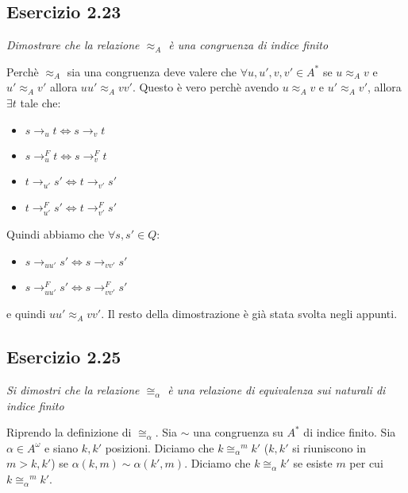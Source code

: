 \documentclass[12pt]{article}
\newcommand{\congAlpha}{\ensuremath{\cong_\alpha}\xspace}
\newcommand{\congAlphaM}{\ensuremath{\congAlpha^m}\xspace}
\begin{document}
\subsection*{Esercizio 2.23}
\textit{Dimostrare che la relazione $\approx_A$ è una congruenza di indice finito}

Perchè $\approx_A$ sia una congruenza deve valere che $\forall u,u',v,v' \in A^*$ se $ u\approx_A v$ e $u' \approx_A v'$ allora $uu' \approx_A vv'$. Questo è vero perchè avendo $ u \approx_A v$ e $u' \approx_A v'$, allora $\exists t$ tale che:
\begin{itemize}
	\item $s \rightarrow_u t \Leftrightarrow s \rightarrow_v t$
	\item $s \rightarrow_u^F t \Leftrightarrow s \rightarrow_v^F t$
	\item $t \rightarrow_{u'} s' \Leftrightarrow t \rightarrow_{v'} s'$
	\item $t \rightarrow_{u'}^F s' \Leftrightarrow t \rightarrow_{v'}^F s'$
\end{itemize} 
Quindi abbiamo che $\forall s,s' \in Q$:
\begin{itemize}
	\item $s \rightarrow_{uu'} s' \Leftrightarrow s \rightarrow_{vv'} s'$
	\item $s \rightarrow_{uu'}^F s' \Leftrightarrow s \rightarrow_{vv'}^F s'$
\end{itemize} 
e quindi $uu' \approx_A vv'$.
Il resto della dimostrazione è già stata svolta negli appunti.

\subsection*{Esercizio 2.25}
\textit{Si dimostri che la relazione $\congAlpha$ è una relazione di equivalenza sui naturali di indice finito}

Riprendo la definizione di $\congAlpha$. Sia $\sim$ una congruenza su $A^*$ di indice finito. Sia $\alpha \in A^\omega$ e siano $k,k'$ posizioni. Diciamo che 
$k\congAlphaM k'$ ($k,k'$ si riuniscono in $m>k,k'$) se $\alpha(k,m)\sim\alpha(k',m)$. Diciamo che $k\congAlpha k'$ se esiste $m$ per cui $k \congAlphaM k'$.
\end{document}
